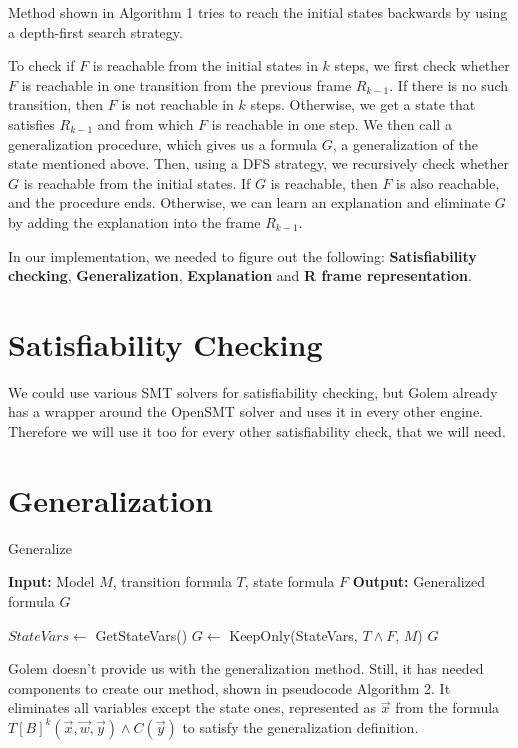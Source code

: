 \noindent Method shown in Algorithm 1 tries to reach the initial states backwards by using a depth-first search strategy.

To check if \( F \) is reachable from the initial states in \( k \) steps, we first check whether \( F \) is reachable in one transition from the previous frame \( R_{k-1} \). If there is no such transition, then \( F \) is not reachable in \( k \) steps. Otherwise, we get a state that satisfies \( R_{k-1} \) and from which \( F \) is reachable in one step. We then call a generalization procedure, which gives us a formula \( G \), a generalization of the state mentioned above. Then, using a DFS strategy, we recursively check whether \( G \) is reachable from the initial states. If \( G \) is reachable, then \( F \) is also reachable, and the procedure ends. Otherwise, we can learn an explanation and eliminate \( G \) by adding the explanation into the frame \( R_{k-1} \).

In our implementation, we needed to figure out the following: \textbf{Satisfiability checking}, \textbf{Generalization}, \textbf{Explanation} and \textbf{R frame representation}.

\section*{Satisfiability Checking}
\noindent We could use various SMT solvers for satisfiability checking, but Golem already has a wrapper around the OpenSMT solver and uses it in every other engine. Therefore we will use it too for every other satisfiability check, that we will need.

\newpage
\section*{Generalization}
\begin{algorithm}
\caption{Generalize}
\begin{algorithmic}[1]
\State \textbf{Input:} Model $M$, transition formula $T$, state formula $F$
\State \textbf{Output:} Generalized formula $G$

    \State $StateVars \gets$ GetStateVars()
    \State $G \gets$ KeepOnly(StateVars, $T \wedge F$, $M$)
    \State \Return $G$

\end{algorithmic}
\end{algorithm}
\noindent Golem doesn't provide us with the generalization method. Still, it has needed components to create our method, shown in pseudocode Algorithm 2. It eliminates all variables except the state ones, represented as $\vec{x}$ from the formula \( T[B]^k(\vec{x}, \vec{w}, \vec{y}) \wedge C(\vec{y}) \) to satisfy the generalization definition.

